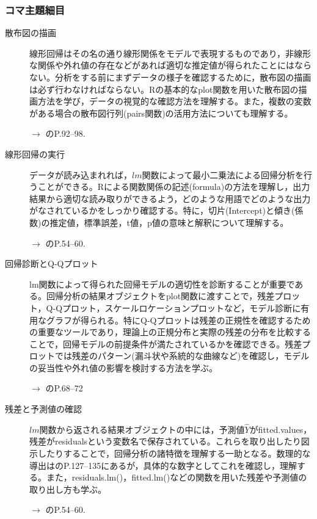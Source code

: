 \subsubsection{コマ主題細目}
\begin{description}

	\item[散布図の描画] 線形回帰はその名の通り線形関係をモデルで表現するものであり，非線形な関係や外れ値の存在などがあれば適切な推定値が得られたことにはならない。分析をする前にまずデータの様子を確認するために，散布図の描画は必ず行わなければならない。Rの基本的なplot関数を用いた散布図の描画方法を学び，データの視覚的な確認方法を理解する。また，複数の変数がある場合の散布図行列(pairs関数)の活用方法についても理解する。
	      \begin{flushright}
		      $\to$ \textcite{kosugi2019}のP.92--98.
	      \end{flushright}

	\item[線形回帰の実行] データが読み込まれれば，$lm$関数によって最小二乗法による回帰分析を行うことができる。Rによる関数関係の記述(formula)の方法を理解し，出力結果から適切な読み取りができるよう，どのような用語でどのような出力がなされているかをしっかり確認する。特に，切片(Intercept)と傾き(係数)の推定値，標準誤差，t値，p値の意味と解釈について理解する。
	      \begin{flushright}
		      $\to$ \textcite{kosugi2018}のP.54--60.
	      \end{flushright}

	\item[回帰診断とQ-Qプロット] lm関数によって得られた回帰モデルの適切性を診断することが重要である。回帰分析の結果オブジェクトをplot関数に渡すことで，残差プロット，Q-Qプロット，スケールロケーションプロットなど，モデル診断に有用なグラフが得られる。特にQ-Qプロットは残差の正規性を確認するための重要なツールであり，理論上の正規分布と実際の残差の分布を比較することで，回帰モデルの前提条件が満たされているかを確認できる。残差プロットでは残差のパターン(漏斗状や系統的な曲線など)を確認し，モデルの妥当性や外れ値の影響を検討する方法を学ぶ。
	      \begin{flushright}
		      $\to$ \textcite{kosugi2018}のP.68--72
	      \end{flushright}

	\item[残差と予測値の確認] $lm$関数から返される結果オブジェクトの中には，予測値$\hat{Y}$がfitted.values，残差がresidualsという変数名で保存されている。これらを取り出したり図示したりすることで，回帰分析の諸特徴を理解する一助となる。数理的な導出は\textcite{kosugi2018}のP.127--135にあるが，具体的な数字としてこれを確認し，理解する。また，residuals.lm()，fitted.lm()などの関数を用いた残差や予測値の取り出し方も学ぶ。
	      \begin{flushright}
		      $\to$ \textcite{kosugi2018}のP.54--60.
	      \end{flushright}


\end{description}
